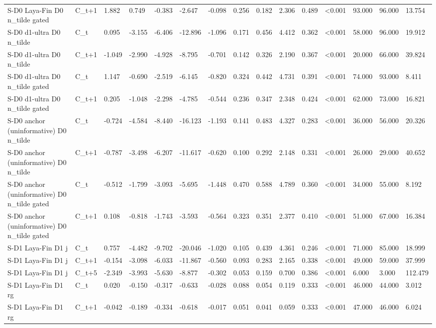 \begin{tabular}{lllllllllllllll}
S-D0 Laya-Fin D0 n\_tilde gated & C\_t+1 & 1.882 & 0.749 & -0.383 & -2.647 & -0.098 & 0.256 & 0.182 & 2.306 & 0.489 & <0.001 & 93.000 & 96.000 & 13.754 \\
S-D0 d1-ultra D0 n\_tilde & C\_t & 0.095 & -3.155 & -6.406 & -12.896 & -1.096 & 0.171 & 0.456 & 4.412 & 0.362 & <0.001 & 58.000 & 96.000 & 19.912 \\
S-D0 d1-ultra D0 n\_tilde & C\_t+1 & -1.049 & -2.990 & -4.928 & -8.795 & -0.701 & 0.142 & 0.326 & 2.190 & 0.367 & <0.001 & 20.000 & 66.000 & 39.824 \\
S-D0 d1-ultra D0 n\_tilde gated & C\_t & 1.147 & -0.690 & -2.519 & -6.145 & -0.820 & 0.324 & 0.442 & 4.731 & 0.391 & <0.001 & 74.000 & 93.000 & 8.411 \\
S-D0 d1-ultra D0 n\_tilde gated & C\_t+1 & 0.205 & -1.048 & -2.298 & -4.785 & -0.544 & 0.236 & 0.347 & 2.348 & 0.424 & <0.001 & 62.000 & 73.000 & 16.821 \\
S-D0 anchor (uninformative) D0 n\_tilde & C\_t & -0.724 & -4.584 & -8.440 & -16.123 & -1.193 & 0.141 & 0.483 & 4.327 & 0.283 & <0.001 & 36.000 & 56.000 & 20.326 \\
S-D0 anchor (uninformative) D0 n\_tilde & C\_t+1 & -0.787 & -3.498 & -6.207 & -11.617 & -0.620 & 0.100 & 0.292 & 2.148 & 0.331 & <0.001 & 26.000 & 29.000 & 40.652 \\
S-D0 anchor (uninformative) D0 n\_tilde gated & C\_t & -0.512 & -1.799 & -3.093 & -5.695 & -1.448 & 0.470 & 0.588 & 4.789 & 0.360 & <0.001 & 34.000 & 55.000 & 8.192 \\
S-D0 anchor (uninformative) D0 n\_tilde gated & C\_t+1 & 0.108 & -0.818 & -1.743 & -3.593 & -0.564 & 0.323 & 0.351 & 2.377 & 0.410 & <0.001 & 51.000 & 67.000 & 16.384 \\
S-D1 Laya-Fin D1 j & C\_t & 0.757 & -4.482 & -9.702 & -20.046 & -1.020 & 0.105 & 0.439 & 4.361 & 0.246 & <0.001 & 71.000 & 85.000 & 18.999 \\
S-D1 Laya-Fin D1 j & C\_t+1 & -0.154 & -3.098 & -6.033 & -11.867 & -0.560 & 0.093 & 0.283 & 2.165 & 0.338 & <0.001 & 49.000 & 59.000 & 37.999 \\
S-D1 Laya-Fin D1 j & C\_t+5 & -2.349 & -3.993 & -5.630 & -8.877 & -0.302 & 0.053 & 0.159 & 0.700 & 0.386 & <0.001 & 6.000 & 3.000 & 112.479 \\
S-D1 Laya-Fin D1 rg & C\_t & 0.020 & -0.150 & -0.317 & -0.633 & -0.028 & 0.088 & 0.054 & 0.119 & 0.333 & <0.001 & 46.000 & 44.000 & 3.012 \\
S-D1 Laya-Fin D1 rg & C\_t+1 & -0.042 & -0.189 & -0.334 & -0.618 & -0.017 & 0.051 & 0.041 & 0.059 & 0.333 & <0.001 & 47.000 & 46.000 & 6.024 \\

\end{tabular}
